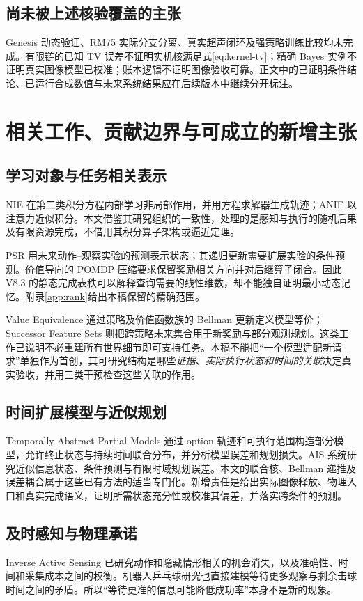 \documentclass[11pt,a4paper,fontset=fandol]{ctexart}
\theoremstyle{definition}
\theoremstyle{remark}
\numberwithin{equation}{section}
\begin{document}
\subsection{尚未被上述核验覆盖的主张}
Genesis 动态验证、RM75 实际分支分离、真实超声闭环及强策略训练比较均未完成。有限链的已知 TV 误差不证明实机核满足式\eqref{eq:kernel-tv}；精确 Bayes 实例不证明真实图像模型已校准；账本逻辑不证明图像验收可靠。正文中的已证明条件结论、已运行合成数值与未来系统结果应在后续版本中继续分开标注。

\section{相关工作、贡献边界与可成立的新增主张}
\label{sec:related}
\subsection{学习对象与任务相关表示}
NIE 在第二类积分方程内部学习非局部作用，并用方程求解器生成轨迹；ANIE 以注意力近似积分\cite{nie}。本文借鉴其研究组织的一致性，处理的是感知与执行的随机后果及有限资源完成，不借用其积分算子架构或逼近定理。

PSR 用未来动作--观察实验的预测表示状态；其递归更新需要扩展实验的条件预测\cite{psr}。价值导向的 POMDP 压缩要求保留奖励相关方向并对后继算子闭合\cite{compression}。因此 V8.3 的静态完成表秩可以解释查询需要的线性维数，却不能独自证明最小动态记忆。附录\ref{app:rank}给出本稿保留的精确范围。

Value Equivalence 通过策略及价值函数族的 Bellman 更新定义模型等价\cite{valueeq}；Successor Feature Sets 则把跨策略未来集合用于新奖励与部分观测规划\cite{sfs}。这类工作已说明不必重建所有世界细节即可支持任务。本稿不能把“一个模型适配新请求”单独作为首创，其可研究结构是哪些\emph{证据、实际执行状态和时间的关联}决定真实验收，并用三类干预检查这些关联的作用。

\subsection{时间扩展模型与近似规划}
Temporally Abstract Partial Models 通过 option 轨迹和可执行范围构造部分模型，允许终止状态与持续时间联合分布，并分析模型误差和规划损失\cite{partial}。AIS 系统研究近似信息状态、条件预测与有限时域规划误差\cite{ais}。本文的联合核、Bellman 递推及误差耦合属于这些已有方法的适当专门化。新增责任是给出实际图像释放、物理入口和真实完成语义，证明所需状态充分性或校准其偏差，并落实跨条件的预测。

\subsection{及时感知与物理承诺}
Inverse Active Sensing 已研究动作和隐藏情形相关的机会消失，以及准确性、时间和采集成本之间的权衡\cite{inverse}。机器人乒乓球研究也直接建模等待更多观察与剩余击球时间之间的矛盾\cite{wang}。所以“等待更准的信息可能降低成功率”本身不是新的现象。
\end{document}
